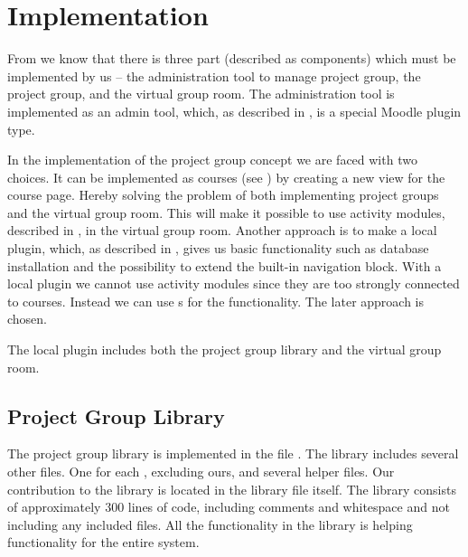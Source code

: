 \chapter{Implementation}
\label{chap:implementation}
From  we know that there is three part (described as components) which must be implemented by us -- the administration tool to manage project group, the project group, and the virtual group room. 
The administration tool is implemented as an admin tool, which, as described in , is a special Moodle plugin type. 

In the implementation of the project group concept we are faced with two choices. 
It can be implemented as courses (see ) by creating a new view for the course page. 
Hereby solving the problem of both implementing project groups and the virtual group room.
This will make it possible to use activity modules, described in , in the virtual group room.
Another approach is to make a local plugin, which, as described in , gives us basic functionality such as database installation and the possibility to extend the built-in navigation block. 
With a local plugin we cannot use activity modules since they are too strongly connected to courses. 
Instead we can use \block{}s for the functionality. 
The later approach is chosen. 

The local plugin includes both the project group library and the virtual group room.


\section{Project Group Library}
\label{sec:pglib}
The project group library is implemented in the file . 
The library includes several other files. %
One for each \subgroup{}, excluding ours, and several helper files. 
Our contribution to the library is located in the library file itself. 
The library consists of approximately $300$ lines of code, including comments and whitespace and not including any included files. 
All the functionality in the library is helping functionality for the entire system. 

